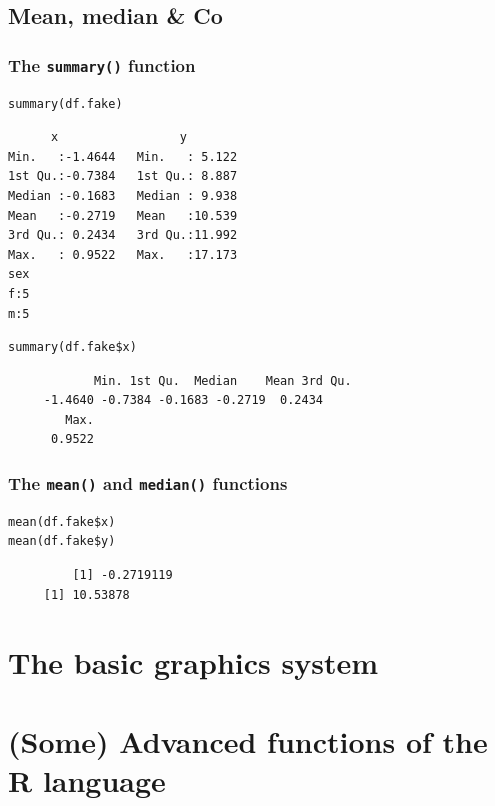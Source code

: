 \documentclass[bigger]{beamer}
\begin{document}
\subsection{Mean, median \& Co}
\label{sec-5-2}
\begin{frame}[fragile,shrink=5]
\frametitle{The \texttt{summary()} function}
\label{sec-5-2-1}


\lstset{language=R}
\begin{lstlisting}
summary(df.fake)
\end{lstlisting}

    
\begin{verbatim}
      x                 y         
Min.   :-1.4644   Min.   : 5.122  
1st Qu.:-0.7384   1st Qu.: 8.887  
Median :-0.1683   Median : 9.938  
Mean   :-0.2719   Mean   :10.539  
3rd Qu.: 0.2434   3rd Qu.:11.992  
Max.   : 0.9522   Max.   :17.173  
sex  
f:5  
m:5
\end{verbatim}


\lstset{language=R}
\begin{lstlisting}
summary(df.fake$x)
\end{lstlisting}

\begin{verbatim}
            Min. 1st Qu.  Median    Mean 3rd Qu. 
     -1.4640 -0.7384 -0.1683 -0.2719  0.2434 
        Max. 
      0.9522
\end{verbatim}
\end{frame}
\begin{frame}[fragile]
\frametitle{The \texttt{mean()} and \texttt{median()} functions}
\label{sec-5-2-2}


\lstset{language=R}
\begin{lstlisting}
mean(df.fake$x)
mean(df.fake$y)
\end{lstlisting}

\begin{verbatim}
         [1] -0.2719119
     [1] 10.53878
\end{verbatim}
\end{frame}
\section{The basic graphics system}
\label{sec-6}
\section{(Some) Advanced functions of the R language}
\label{sec-7}
\end{document}
